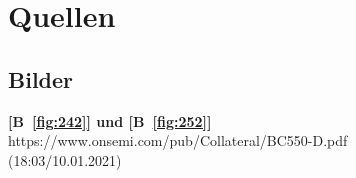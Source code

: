 \chapter{Quellen}
\section*{Bilder}
\textbf{[B~\ref{fig:242}] und [B~\ref{fig:252}]}     https://www.onsemi.com/pub/Collateral/BC550-D.pdf\\
(18:03/10.01.2021)